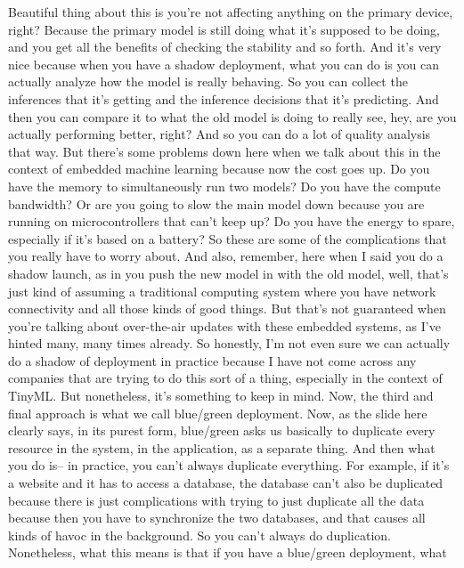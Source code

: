 {{{{    Beautiful thing about this is you're not affecting anything
    on the primary device, right?
    Because the primary model is still doing what it's supposed to be doing,
    and you get all the benefits of checking the stability and so forth.
    And it's very nice because when you have a shadow deployment, what you can do
    is you can actually analyze how the model is really behaving.
    So you can collect the inferences that it's getting
    and the inference decisions that it's predicting.
    And then you can compare it to what the old model is doing to really see, hey,
    are you actually performing better, right?
    And so you can do a lot of quality analysis that way.
    But there's some problems down here when we
    talk about this in the context of embedded machine
    learning because now the cost goes up.
    Do you have the memory to simultaneously run two models?
    Do you have the compute bandwidth?
    Or are you going to slow the main model down
    because you are running on microcontrollers that can't keep up?
    Do you have the energy to spare, especially if it's based on a battery?
    So these are some of the complications that you really have to worry about.
    And also, remember, here when I said you do a shadow launch,
    as in you push the new model in with the old model, well, that's
    just kind of assuming a traditional computing system
    where you have network connectivity and all those kinds of good things.
    But that's not guaranteed when you're talking about over-the-air updates
    with these embedded systems, as I've hinted many, many times already.
    So honestly, I'm not even sure we can actually do a shadow of deployment
    in practice because I have not come across any companies that
    are trying to do this sort of a thing, especially in the context of TinyML.
    But nonetheless, it's something to keep in mind.
    Now, the third and final approach is what we call blue/green deployment.
    Now, as the slide here clearly says, in its purest form,
    blue/green asks us basically to duplicate every resource in the system,
    in the application, as a separate thing.
    And then what you do is-- in practice, you can't always duplicate everything.
    For example, if it's a website and it has to access a database,
    the database can't also be duplicated because there is just
    complications with trying to just duplicate all the data because then you
    have to synchronize the two databases, and that causes
    all kinds of havoc in the background.
    So you can't always do duplication.
    Nonetheless, what this means is that if you have a blue/green deployment, what
}}}}

